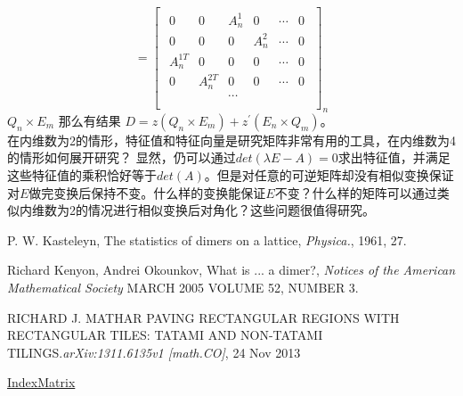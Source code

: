 \documentclass{amsc}          %
\numberwithin{equation}{section} %
\begin{document}
$$= \begin{bmatrix}\begin{smallmatrix}
 0& 0& A^{1}_{n} & 0 &\cdots& 0\\
  0& 0& 0 & A^{2}_{n} &\cdots& 0\\
 A^{1T}_{n} & 0& 0 & 0 &\cdots& 0\\
 0& A^{2T}_{n} & 0 & 0 &\cdots& 0\\
 & & \cdots & &\\
\end{smallmatrix}\end{bmatrix}_{n} $$
$Q_{n}\times E_{m}$
那么有结果
$D=z(Q_{n}\times E_{m})  +  z^{'} (E_{n} \times Q_{m})$。\\
在内维数为2的情形，特征值和特征向量是研究矩阵非常有用的工具，在内维数为4的情形如何展开研究？
显然，仍可以通过$det(\lambda E - A) = 0$求出特征值，并满足这些特征值的乘积恰好等于$det(A)$。但是对任意的可逆矩阵却没有相似变换保证对$E$做完变换后保持不变。什么样的变换能保证$E$不变？什么样的矩阵可以通过类似内维数为2的情况进行相似变换后对角化？这些问题很值得研究。

\BeginRef
{} P. W. Kasteleyn, The statistics of dimers on a lattice, {\it Physica.}, 1961, 27.

 Richard Kenyon, Andrei Okounkov,  What is ... a dimer?, {\it Notices of the American Mathematical Society} MARCH 2005 VOLUME 52, NUMBER 3.

 RICHARD J. MATHAR PAVING RECTANGULAR REGIONS WITH RECTANGULAR TILES: TATAMI AND NON-TATAMI TILINGS.{\it arXiv:1311.6135v1 [math.CO]},  24 Nov 2013

 \href{https://github.com/huih1984/Lattice-Tilings-and-Hyperdeterminant/blob/master/vc\%2B\%2B/high\%20dimension\%20matrix/IndexMatrix.cpp}{IndexMatrix}

\EndRef
\end{document}
